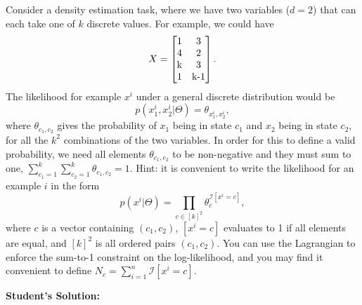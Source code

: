 \documentclass{article}
\begin{document}
Consider a density estimation task, where we have two variables ($d=2$) that can each take one of $k$ discrete values. For example, we could have
\[
X = \mat{1 & 3\\4 & 2\\$k$ & 3\\1 & $k-1$}.
\]
The likelihood for example $x^i$ under a general discrete distribution would be
\[
p(x^i_1, x^i_2 | \Theta) = \theta_{x_1^i,x_2^i},
\]
where $\theta_{c_1,c_2}$ gives the probability of $x_1$ being in state $c_1$ and $x_2$ being in state $c_2$, for all the $k^2$ combinations of the two variables. In order for this to define a valid probability, we need all elements $\theta_{c_1,c_2}$ to be non-negative and they must sum to one, $\sum_{c_1=1}^k\sum_{c_2=1}^k \theta_{c_1,c_2} = 1$.
Hint: it is convenient to write the likelihood for an example $i$ in the form
\[
p(x^i | \Theta) = \prod_{c \in [k]^2}\theta_c^{\mathcal{I}[x^i = c]},
\]
where $c$ is a vector containing $(c_1,c_2)$, $[x^i = c]$ evaluates to 1 if all elements are equal, and $[k]^2$ is all ordered pairs $(c_1,c_2)$. You can use the Lagrangian to enforce the sum-to-1 constraint on the log-likelihood, and you may find it convenient to define $N_c = \sum_{i=1}^n \mathcal{I}[x^i = c]$.


\textbf{Student's Solution:}
\end{document}
